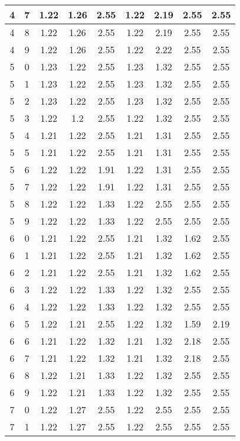 \begin{longtable}{|c|c||c||c|c||c|c|c|c|}
	4 & 7 & 1.22 & 1.26 & 2.55 & 1.22 & 2.19 & 2.55 & 2.55 \\ \hline
	4 & 8 & 1.22 & 1.26 & 2.55 & 1.22 & 2.19 & 2.55 & 2.55 \\ \hline
	4 & 9 & 1.22 & 1.26 & 2.55 & 1.22 & 2.22 & 2.55 & 2.55 \\ \hline
	5 & 0 & 1.23 & 1.22 & 2.55 & 1.23 & 1.32 & 2.55 & 2.55 \\ \hline
	5 & 1 & 1.23 & 1.22 & 2.55 & 1.23 & 1.32 & 2.55 & 2.55 \\ \hline
	5 & 2 & 1.23 & 1.22 & 2.55 & 1.23 & 1.32 & 2.55 & 2.55 \\ \hline
	5 & 3 & 1.22 & 1.2 & 2.55 & 1.22 & 1.32 & 2.55 & 2.55 \\ \hline
	5 & 4 & 1.21 & 1.22 & 2.55 & 1.21 & 1.31 & 2.55 & 2.55 \\ \hline
	5 & 5 & 1.21 & 1.22 & 2.55 & 1.21 & 1.31 & 2.55 & 2.55 \\ \hline
	5 & 6 & 1.22 & 1.22 & 1.91 & 1.22 & 1.31 & 2.55 & 2.55 \\ \hline
	5 & 7 & 1.22 & 1.22 & 1.91 & 1.22 & 1.31 & 2.55 & 2.55 \\ \hline
	5 & 8 & 1.22 & 1.22 & 1.33 & 1.22 & 2.55 & 2.55 & 2.55 \\ \hline
	5 & 9 & 1.22 & 1.22 & 1.33 & 1.22 & 2.55 & 2.55 & 2.55 \\ \hline
	6 & 0 & 1.21 & 1.22 & 2.55 & 1.21 & 1.32 & 1.62 & 2.55 \\ \hline
	6 & 1 & 1.21 & 1.22 & 2.55 & 1.21 & 1.32 & 1.62 & 2.55 \\ \hline
	6 & 2 & 1.21 & 1.22 & 2.55 & 1.21 & 1.32 & 1.62 & 2.55 \\ \hline
	6 & 3 & 1.22 & 1.22 & 1.33 & 1.22 & 1.32 & 2.55 & 2.55 \\ \hline
	6 & 4 & 1.22 & 1.22 & 1.33 & 1.22 & 1.32 & 2.55 & 2.55 \\ \hline
	6 & 5 & 1.22 & 1.21 & 2.55 & 1.22 & 1.32 & 1.59 & 2.19 \\ \hline
	6 & 6 & 1.21 & 1.22 & 1.32 & 1.21 & 1.32 & 2.18 & 2.55 \\ \hline
	6 & 7 & 1.21 & 1.22 & 1.32 & 1.21 & 1.32 & 2.18 & 2.55 \\ \hline
	6 & 8 & 1.22 & 1.21 & 1.33 & 1.22 & 1.32 & 2.55 & 2.55 \\ \hline
	6 & 9 & 1.22 & 1.21 & 1.33 & 1.22 & 1.32 & 2.55 & 2.55 \\ \hline
	7 & 0 & 1.22 & 1.27 & 2.55 & 1.22 & 2.55 & 2.55 & 2.55 \\ \hline
	7 & 1 & 1.22 & 1.27 & 2.55 & 1.22 & 2.55 & 2.55 & 2.55 \\ \hline

\end{longtable}
